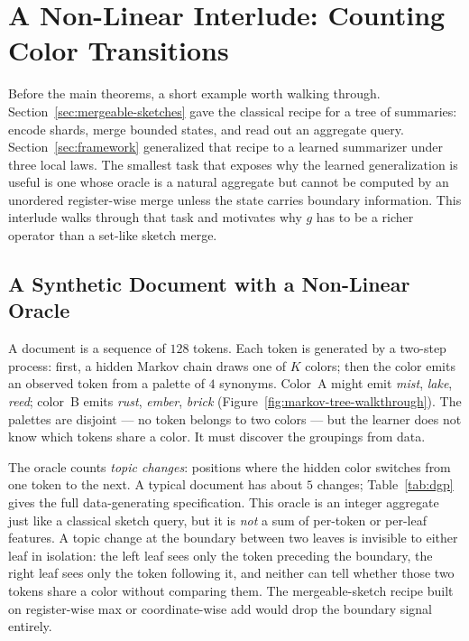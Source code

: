 \section{A Non-Linear Interlude: Counting Color Transitions}\label{sec:markov-interlude}

Before the main theorems, a short example worth walking through.
Section~\ref{sec:mergeable-sketches} gave the classical recipe for a tree
of summaries: encode shards, merge bounded states, and read out an
aggregate query. Section~\ref{sec:framework} generalized that recipe to a
learned summarizer under three local laws. The smallest task that exposes
why the learned generalization is useful is one whose oracle is a natural
aggregate but cannot be computed by an unordered register-wise merge unless
the state carries boundary information. This interlude walks through that
task and motivates why $g$ has to be a richer operator than a set-like
sketch merge.

\subsection{A Synthetic Document with a Non-Linear Oracle}\label{sec:color-sequences}

A document is a sequence of $128$ tokens. Each token is generated by a
two-step process: first, a hidden Markov chain draws one of $K$ colors;
then the color emits an observed token from a palette of $4$ synonyms.
Color~A might emit \emph{mist}, \emph{lake}, \emph{reed}; color~B emits
\emph{rust}, \emph{ember}, \emph{brick} (Figure~\ref{fig:markov-tree-walkthrough}).
The palettes are disjoint --- no token belongs to two colors --- but the
learner does not know which tokens share a color. It must discover the
groupings from data.

The oracle counts \emph{topic changes}: positions where the hidden color
switches from one token to the next. A typical document has about $5$
changes; Table~\ref{tab:dgp} gives the full data-generating specification.
This oracle is an integer aggregate just like a classical sketch query,
but it is \emph{not} a sum of per-token or per-leaf features. A topic
change at the boundary between two leaves is invisible to either leaf in
isolation: the left leaf sees only the token preceding the boundary, the
right leaf sees only the token following it, and neither can tell whether
those two tokens share a color without comparing them. The mergeable-sketch
recipe built on register-wise max or coordinate-wise add would drop the
boundary signal entirely.


